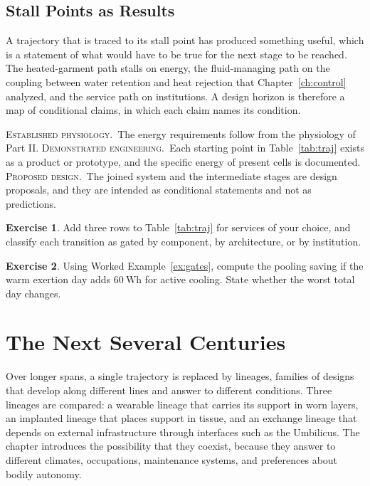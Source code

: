 \documentclass[11pt,openany]{book}
\theoremstyle{definition}
\newtheorem{exercise}{Exercise}[chapter]
\theoremstyle{remark}
\newcommand{\est}{\textsc{Established physiology.}\ }
\newcommand{\dem}{\textsc{Demonstrated engineering.}\ }
\newcommand{\pro}{\textsc{Proposed design.}\ }
\begin{document}
\section{Stall Points as Results}

A trajectory that is traced to its stall point has produced something useful, which is a statement of what would have to be true for the next stage to be reached. The heated-garment path stalls on energy, the fluid-managing path on the coupling between water retention and heat rejection that Chapter~\ref{ch:control} analyzed, and the service path on institutions. A design horizon is therefore a map of conditional claims, in which each claim names its condition.

\begin{evidence}
\est The energy requirements follow from the physiology of Part II. \dem Each starting point in Table~\ref{tab:traj} exists as a product or prototype, and the specific energy of present cells is documented. \pro The joined system and the intermediate stages are design proposals, and they are intended as conditional statements and not as predictions.
\end{evidence}

\begin{exercise}
Add three rows to Table~\ref{tab:traj} for services of your choice, and classify each transition as gated by component, by architecture, or by institution.
\end{exercise}

\begin{exercise}
Using Worked Example~\ref{ex:gates}, compute the pooling saving if the warm exertion day adds $60\ \mathrm{Wh}$ for active cooling. State whether the worst total day changes.
\end{exercise}

\chapter{The Next Several Centuries}
\label{ch:lineages}

Over longer spans, a single trajectory is replaced by lineages, families of designs that develop along different lines and answer to different conditions. Three lineages are compared: a wearable lineage that carries its support in worn layers, an implanted lineage that places support in tissue, and an exchange lineage that depends on external infrastructure through interfaces such as the Umbilicus. The chapter introduces the possibility that they coexist, because they answer to different climates, occupations, maintenance systems, and preferences about bodily autonomy.
\end{document}
